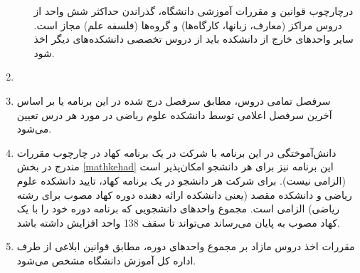 \documentclass{article}
\begin{document}
\begin{enumerate}
\begin{enumerate}
				درچارچوب قوانین و مقررات آموزشی دانشگاه، گذراندن حداکثر شش واحد از دروس مراکز (معارف، زبانها، کارگاه‌ها) و گروه‌ها (فلسفه علم) مجاز است. سایر واحدهای خارج از دانشکده باید از دروس تخصصی دانشکده‌های دیگر اخذ شود.
			\end{enumerate}
        \item
         \item
			سرفصل تمامی دروس، مطابق سرفصل درج شده در این برنامه یا بر اساس آخرین سرفصل اعلامی توسط دانشکده علوم ریاضی در مورد هر درس تعیین می‌شود.
         \item
			دانش‌آموختگی در این برنامه با شرکت در یک برنامه کهاد در چارچوب مقررات مندرج در بخش 
			\autoref{mathkehad}
			 این برنامه نیز برای هر دانشجو امکان‌پذیر است (الزامی نیست). برای شرکت هر دانشجو در یک برنامه کهاد، تایید دانشکده علوم ریاضی و دانشکده مقصد (یعنی دانشکده ارائه دهنده دوره کهاد مصوب برای رشته ریاضی) الزامی است. مجموع واحدهای دانشجویی که برنامه دوره خود را با یک کهاد مصوب به پایان می‌رساند می‌تواند تا سقف 138 واحد افزایش داشته باشد.
         \item
			مقررات اخذ دروس مازاد بر مجموع واحدهای دوره، مطابق قوانین ابلاغی از طرف اداره کل آموزش دانشگاه مشخص می‌شود.

    \end{enumerate}

\pagebreak
\end{document}
